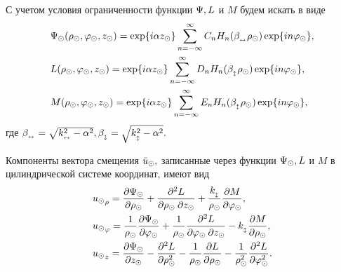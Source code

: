 С учетом условия ограниченности функции $\P, L$ и $M$ будем искать в виде
\begin{align}
&\P\cyl(\r\cyl, \f\cyl, z\cyl)= \exp\{i\alpha z\cyl\}\sum_{n=-\infty}^{\infty}C_nH_n(\beta_{\prodol} \r\cyl)\exp\{in\f\cyl\},\label{pazloj_psi}\\
&L(\r\cyl, \f\cyl, z\cyl)= \exp\{i\alpha z\cyl\}\sum_{n=-\infty}^{\infty}D_nH_n(\beta_{\popr} \r\cyl)\exp\{in\f\cyl\},\label{pazloj_l}\\
&M(\r\cyl, \f\cyl, z\cyl)= \exp\{i\alpha z\cyl\}\sum_{n=-\infty}^{\infty}E_nH_n(\beta_{\popr} \r\cyl)\exp\{in\f\cyl\},\label{pazloj_m}
\end{align}
где $\beta_{\prodol}=\sqrt{k_{\prodol}^2-\alpha^2}, \beta_{\popr}=\sqrt{k_{\popr}^2-\alpha^2}.$

Компоненты вектора смещения $\bar{u}\cyl,$ записанные через функции $\P\cyl, L$ и $M$ в цилиндрической системе координат, имеют вид
\begin{equation}\label{u_cherez_L_M}
\begin{split}
&{u\cyl}_\r=\frac{\partial \P\cyl}{\partial\r\cyl}+\frac{\partial^2 L}{\partial\r\cyl\:\partial z\cyl}+\frac{k_{\popr}}{\r\cyl}\frac{\partial M}{\partial \f\cyl},\\
&{u\cyl}_\f=\frac{1}{\r\cyl}\frac{\partial \P\cyl}{\partial \f\cyl}+\frac{1}{\r\cyl}\frac{\partial^{2} L}{\partial\f\cyl\: \partial z\cyl}-k_{\popr}\frac{\partial M}{\partial \r\cyl},\\
&{u\cyl}_z=\frac{\partial\P\cyl}{\partial z\cyl}-\frac{\partial^{2} L}{\partial \r^2\cyl}-\frac{1}{\r\cyl}\frac{\partial L}{\partial \r\cyl}-\frac{1}{\r^2\cyl}\frac{\partial^2L}{\partial\f^2\cyl}.
\end{split}
\end{equation}

